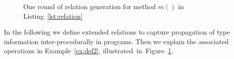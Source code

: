 \documentclass{fac}
\begin{document}
\begin{figure}
\caption{One round of relation generation for method $m()$ in Listing~\ref{lst:relation}}
\label{fig:relations}
\end{figure}


In the following we define extended relations to capture propagation of type information inter-procedurally in programs. %
Then we explain the associated operations in Example~\ref{ex:def2}, illustrated~in~Figure~\ref{fig:relations}.
\end{document}
